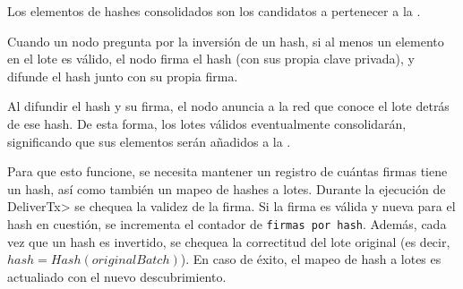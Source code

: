 %
Los elementos de hashes consolidados son los candidatos a pertenecer a la \setchain.

%
Cuando un nodo pregunta por la inversión de un hash, si al menos un elemento en el lote
es válido, el nodo firma el hash (con sus propia clave privada), y difunde el hash junto
con su propia firma.

%
Al difundir el hash y su firma, el nodo anuncia a la red que conoce el lote detrás de ese hash.
%
De esta forma, los lotes válidos eventualmente consolidarán, significando que sus elementos
serán añadidos a la \setchain.

Para que esto funcione, se necesita mantener un registro de cuántas firmas tiene un hash,
así como también un mapeo de hashes a lotes.
%
Durante la ejecución de \<DeliverTx> se chequea la validez de la firma.
%
Si la firma es válida y nueva para el hash en cuestión, se incrementa el contador de
\texttt{firmas por hash}.
%
Además, cada vez que un hash es invertido, se chequea la correctitud del lote original
(es decir, $hash = Hash(originalBatch)$). En caso de éxito, el mapeo de hash a lotes
es actualiado con el nuevo descubrimiento.

%


%




